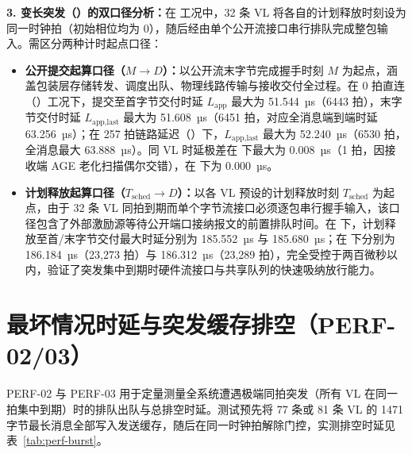 \textbf{3. 变长突发（）的双口径分析：}在  工况中，32 条 VL 将各自的计划释放时刻设为同一时钟拍（初始相位均为 0），随后经由单个公开流接口串行排队完成整包输入。需区分两种计时起点口径：
\begin{itemize}
  \item \textbf{公开提交起算口径（$M\to D$）：}以公开流末字节完成握手时刻 $M$ 为起点，涵盖包装层存储转发、调度出队、物理线路传输与接收交付全过程。在 0 拍直连（）工况下，提交至首字节交付时延 $L_\text{app}$ 最大为 51.544~µs（6443 拍），末字节交付时延 $L_\text{app,last}$ 最大为 51.608~µs（6451 拍，对应全消息端到端时延 63.256~µs）；在 257 拍链路延迟（）下，$L_\text{app,last}$ 最大为 52.240~µs（6530 拍，全消息最大 63.888~µs）。同 VL 时延极差在  下最大为 0.008~µs（1 拍，因接收端 AGE 老化扫描偶尔交错），在  下为 0.000~µs。
  \item \textbf{计划释放起算口径（$T_\text{sched}\to D$）：}以各 VL 预设的计划释放时刻 $T_\text{sched}$ 为起点，由于 32 条 VL 同拍到期而单个字节流接口必须逐包串行握手输入，该口径包含了外部激励源等待公开端口接纳报文的前置排队时间。在  下，计划释放至首/末字节交付最大时延分别为 185.552~µs 与 185.680~µs；在  下分别为 186.184~µs（23,273 拍）与 186.312~µs（23,289 拍），完全受控于两百微秒以内，验证了突发集中到期时硬件流接口与共享队列的快速吸纳放行能力。
\end{itemize}

\section{最坏情况时延与突发缓存排空（PERF-02/03）}\label{sec:p-worst}

PERF-02 与 PERF-03 用于定量测量全系统遭遇极端同拍突发（所有 VL 在同一拍集中到期）时的排队出队与总排空时延。测试预先将 77 条或 81 条 VL 的 1471 字节最长消息全部写入发送缓存，随后在同一时钟拍解除门控，实测排空时延见表~\ref{tab:perf-burst}。

